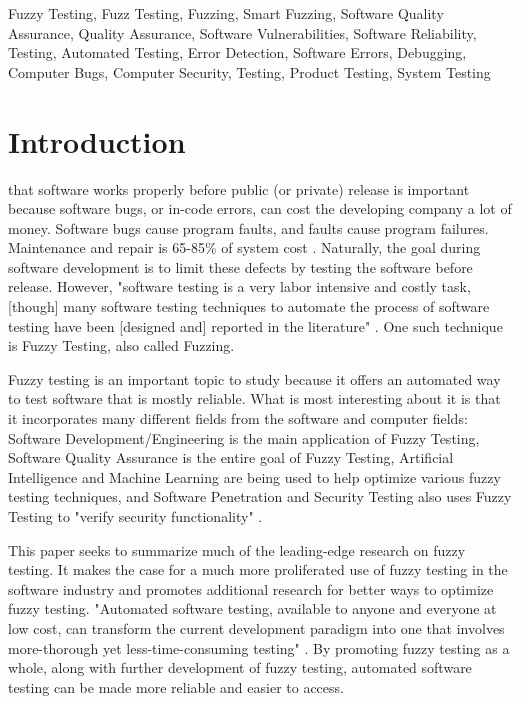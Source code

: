 \documentclass[10pt, final, journal, letterpaper, twoside, twocolumn]{IEEEtran}
\begin{document}
\begin{IEEEkeywords}
	Fuzzy Testing, Fuzz Testing, Fuzzing, Smart Fuzzing, Software Quality Assurance, Quality Assurance, Software Vulnerabilities, Software Reliability, Testing, Automated Testing, Error Detection, Software Errors, Debugging, Computer Bugs, Computer Security, Testing, Product Testing, System Testing
\end{IEEEkeywords}

\section{Introduction}
	 that software works properly before public (or private) release is important because software bugs, or in-code errors, can cost the developing company a lot of money. Software bugs cause program faults, and faults cause program failures. Maintenance and repair is 65-85\% of system cost \cite{slide-defect}. Naturally, the goal during software development is to limit these defects by testing the software before release. However, "software testing is a very labor intensive and costly task, [though] many software testing techniques to automate the process of software testing have been [designed and] reported in the literature" \cite{fuzzy-logic}. One such technique is Fuzzy Testing, also called Fuzzing.
	
	Fuzzy testing is an important topic to study because it offers an automated way to test software that is mostly reliable. What is most interesting about it is that it incorporates many different fields from the software and computer fields: Software Development/Engineering is the main application of Fuzzy Testing, Software Quality Assurance is the entire goal of Fuzzy Testing, Artificial Intelligence and Machine Learning are being used to help optimize various fuzzy testing techniques, and Software Penetration and Security Testing also uses Fuzzy Testing to "verify security functionality" \cite{penetration}.
	
	This paper seeks to summarize much of the leading-edge research on fuzzy testing. It makes the case for a much more proliferated use of fuzzy testing in the software industry and promotes additional research for better ways to optimize fuzzy testing. "Automated software testing, available to anyone and everyone at low cost, can transform the current development paradigm into one that involves more-thorough yet less-time-consuming testing" \cite{automation}. By promoting fuzzy testing as a whole, along with further development of fuzzy testing, automated software testing can be made more reliable and easier to access.
\end{document}
